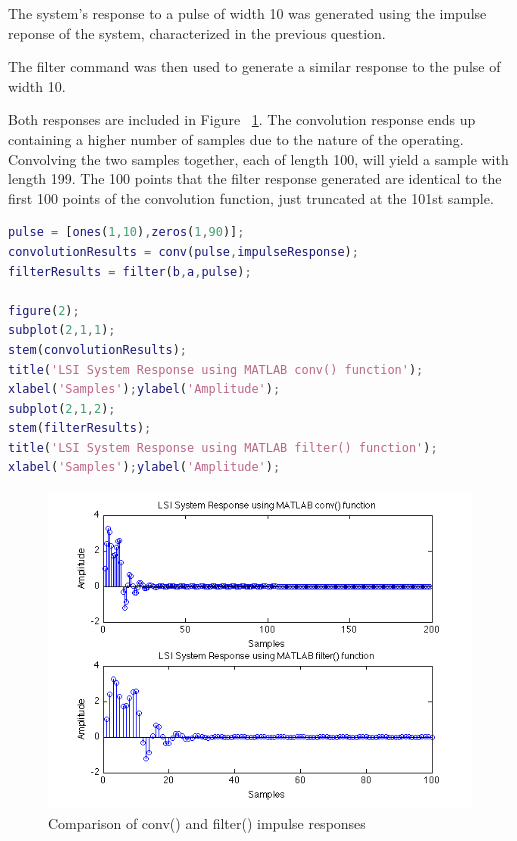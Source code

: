 \documentclass{article}
\begin{document}
\begin{par}
The system's response to a pulse of width 10 was generated using the impulse reponse of the system, characterized in the previous question.
\end{par} \vspace{1em}
\begin{par}
The filter command was then used to generate a similar response to the pulse of width 10.
\end{par} \vspace{1em}
\begin{par}
Both responses are included in Figure ~\ref{fig:impcomp}.  The convolution response ends up containing a higher number of samples due to the nature of the operating.  Convolving the two samples together, each of length 100, will yield a sample with length 199.  The 100 points that the filter response generated are identical to the first 100 points of the convolution function, just truncated at the 101st sample.
\end{par} \vspace{1em}
\begin{lstlisting}[language=matlab]
pulse = [ones(1,10),zeros(1,90)];
convolutionResults = conv(pulse,impulseResponse);
filterResults = filter(b,a,pulse);

figure(2);
subplot(2,1,1);
stem(convolutionResults);
title('LSI System Response using MATLAB conv() function');
xlabel('Samples');ylabel('Amplitude');
subplot(2,1,2);
stem(filterResults);
title('LSI System Response using MATLAB filter() function');
xlabel('Samples');ylabel('Amplitude');
\end{lstlisting}

\begin{figure}[here]
	\begin{center}
		\includegraphics [width=5in]{Project2_02.png}
		\caption{Comparison of conv() and filter() impulse responses}
		\label{fig:impcomp}
	\end{center}
\end{figure}
\end{document}
